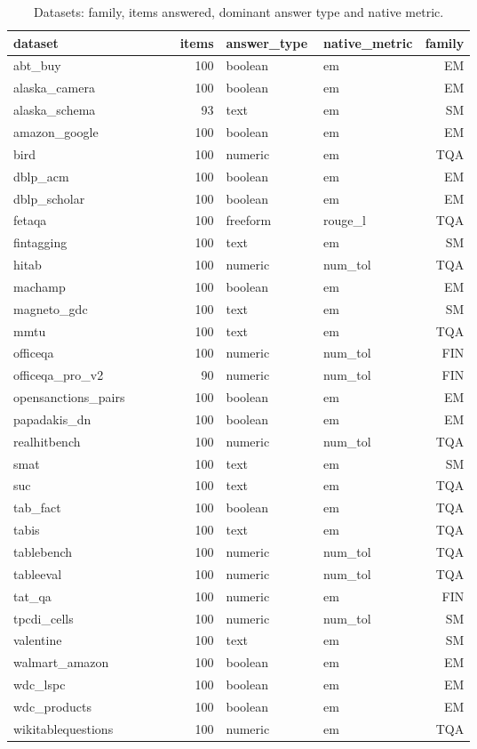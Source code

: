 \scriptsize
\setlength{\tabcolsep}{3pt}
\begin{longtable}{p{0.362\linewidth}rp{0.211\linewidth}p{0.227\linewidth}r}
\caption{Datasets: family, items answered, dominant answer type and native metric.}\label{tab:datasets}\\
\toprule
dataset & items & answer\_\allowbreak{}type & native\_\allowbreak{}metric & family \\
\midrule
abt\_\allowbreak{}buy & 100 & boolean & em & EM \\
alaska\_\allowbreak{}camera & 100 & boolean & em & EM \\
alaska\_\allowbreak{}schema & 93 & text & em & SM \\
amazon\_\allowbreak{}google & 100 & boolean & em & EM \\
bird & 100 & numeric & em & TQA \\
dblp\_\allowbreak{}acm & 100 & boolean & em & EM \\
dblp\_\allowbreak{}scholar & 100 & boolean & em & EM \\
fetaqa & 100 & freeform & rouge\_\allowbreak{}l & TQA \\
fintagging & 100 & text & em & SM \\
hitab & 100 & numeric & num\_\allowbreak{}tol & TQA \\
machamp & 100 & boolean & em & EM \\
magneto\_\allowbreak{}gdc & 100 & text & em & SM \\
mmtu & 100 & text & em & TQA \\
officeqa & 100 & numeric & num\_\allowbreak{}tol & FIN \\
officeqa\_\allowbreak{}pro\_\allowbreak{}v2 & 90 & numeric & num\_\allowbreak{}tol & FIN \\
opensanctions\_\allowbreak{}pairs & 100 & boolean & em & EM \\
papadakis\_\allowbreak{}dn & 100 & boolean & em & EM \\
realhitbench & 100 & numeric & num\_\allowbreak{}tol & TQA \\
smat & 100 & text & em & SM \\
suc & 100 & text & em & TQA \\
tab\_\allowbreak{}fact & 100 & boolean & em & TQA \\
tabis & 100 & text & em & TQA \\
tablebench & 100 & numeric & num\_\allowbreak{}tol & TQA \\
tableeval & 100 & numeric & num\_\allowbreak{}tol & TQA \\
tat\_\allowbreak{}qa & 100 & numeric & em & FIN \\
tpcdi\_\allowbreak{}cells & 100 & numeric & num\_\allowbreak{}tol & SM \\
valentine & 100 & text & em & SM \\
walmart\_\allowbreak{}amazon & 100 & boolean & em & EM \\
wdc\_\allowbreak{}lspc & 100 & boolean & em & EM \\
wdc\_\allowbreak{}products & 100 & boolean & em & EM \\
wikitablequestions & 100 & numeric & em & TQA \\
\bottomrule
\end{longtable}
\normalsize
